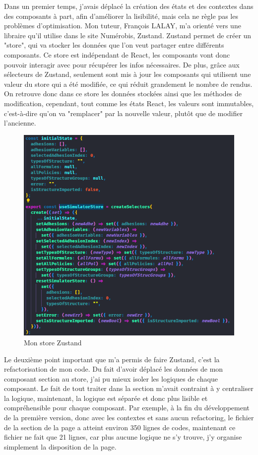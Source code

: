 \documentclass[a4paper,12pt]{report}
\begin{document}
Dans un premier temps, j'avais déplacé la création des états et des contextes dans des composants à part, afin d'améliorer la lisibilité, mais cela ne règle pas les problèmes d'optimisation. Mon tuteur, François LALAY, m'a orienté vers une libraire qu'il utilise dans le site Numérobis, Zustand. Zustand permet de créer un "store", qui va stocker les données que l'on veut partager entre différents composants. Ce store est indépendant de React, les composants vont donc pouvoir interagir avec pour récupérer les infos nécessaires. De plus, grâce aux sélecteurs de Zustand, seulement sont mis à jour les composants qui utilisent une valeur du store qui a été modifiée, ce qui réduit grandement le nombre de rendus. On retrouve donc dans ce store les données stockées ainsi que les méthodes de modification, cependant, tout comme les états React, les valeurs sont immutables, c'est-à-dire qu'on va "remplacer" par la nouvelle valeur, plutôt que de modifier l'ancienne.

\begin{figure}[H]
    \centering
    \includegraphics[scale=0.4]{storeZustand.png}
    \caption{Mon store Zustand}
    \label{fig:store-zustand}
\end{figure}

Le deuxième point important que m'a permis de faire Zustand, c'est la refactorisation de mon code. Du fait d'avoir déplacé les données de mon composant section au store, j'ai pu mieux isoler les logiques de chaque composant. Le fait de tout traiter dans la section m'avait contraint à y centraliser la logique, maintenant, la logique est séparée et donc plus lisible et compréhensible pour chaque composant. Par exemple, à la fin du développement de la première version, donc avec les contextes et sans aucun refactoring, le fichier de la section de la page a atteint environ 350 lignes de codes, maintenant ce fichier ne fait que 21 lignes, car plus aucune logique ne s'y trouve, j'y organise simplement la disposition de la page.
\end{document}
